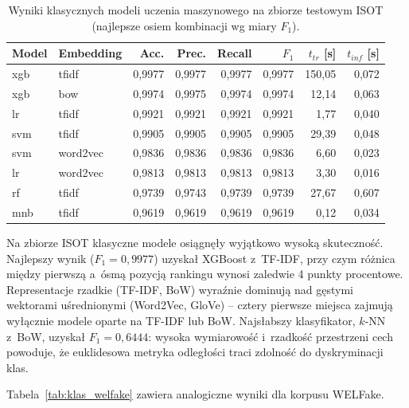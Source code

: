 \documentclass[oneside,polski,logo]{amuthesis}
\begin{document}
\begin{table}[ht]
\centering
\caption{Wyniki klasycznych modeli uczenia maszynowego na zbiorze
testowym ISOT (najlepsze osiem kombinacji wg miary $F_1$).}
\label{tab:klas_isot}
\begin{tabular}{llrrrrrr}
\toprule
Model & Embedding & Acc. & Prec. & Recall & $F_1$ & $t_{tr}$ [s] & $t_{inf}$ [s] \\
\midrule
xgb & tfidf    & 0,9977 & 0,9977 & 0,9977 & 0,9977 & 150,05 & 0,072 \\
xgb & bow      & 0,9974 & 0,9975 & 0,9974 & 0,9974 & 12,14  & 0,063 \\
lr  & tfidf    & 0,9921 & 0,9921 & 0,9921 & 0,9921 & 1,77   & 0,040 \\
svm & tfidf    & 0,9905 & 0,9905 & 0,9905 & 0,9905 & 29,39  & 0,048 \\
svm & word2vec & 0,9836 & 0,9836 & 0,9836 & 0,9836 & 6,60   & 0,023 \\
lr  & word2vec & 0,9813 & 0,9813 & 0,9813 & 0,9813 & 3,30   & 0,016 \\
rf  & tfidf    & 0,9739 & 0,9743 & 0,9739 & 0,9739 & 27,67  & 0,607 \\
mnb & tfidf    & 0,9619 & 0,9619 & 0,9619 & 0,9619 & 0,12   & 0,034 \\
\bottomrule
\end{tabular}
\end{table}

Na zbiorze ISOT klasyczne modele osiągnęły wyjątkowo wysoką skuteczność.
Najlepszy wynik (\(F_1 = 0{,}9977\)) uzyskał XGBoost z~TF-IDF, przy czym
różnica między pierwszą a~ósmą pozycją rankingu wynosi zaledwie 4 punkty
procentowe. Representacje rzadkie (TF-IDF, BoW) wyraźnie dominują nad
gęstymi wektorami uśrednionymi (Word2Vec, GloVe) -- cztery pierwsze miejsca
zajmują wyłącznie modele oparte na TF-IDF lub BoW. Najsłabszy klasyfikator,
$k$-NN z~BoW, uzyskał \(F_1 = 0{,}6444\): wysoka wymiarowość i~rzadkość
przestrzeni cech powoduje, że euklidesowa metryka odległości traci
zdolność do dyskryminacji klas.

Tabela~\ref{tab:klas_welfake} zawiera analogiczne wyniki dla korpusu
WELFake.
\end{document}
